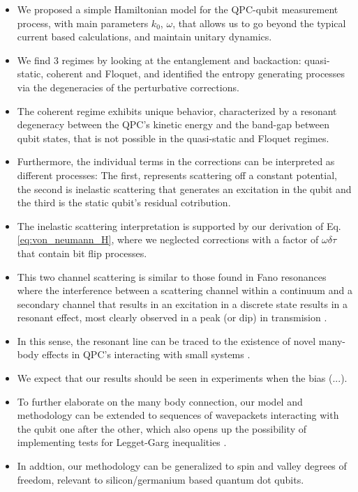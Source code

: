 \documentclass[10pt,
 amsmath,amssymb,
 aps,prb, twocolumn
]{revtex4-2}
\begin{document}
\begin{itemize}
    \item We proposed a simple Hamiltonian model for the
    QPC-qubit measurement process, with main parameters $k_0$, $\omega$, that allows us to go beyond the typical current based calculations, and maintain unitary dynamics.

    \item  We find 3 regimes by looking at the entanglement and backaction: quasi-static, coherent and
    Floquet, and identified the entropy generating processes via the degeneracies of the perturbative corrections.

    \item The coherent regime exhibits unique behavior, characterized by a resonant degeneracy between the QPC's kinetic energy and the band-gap between qubit states, that is not possible in the quasi-static and Floquet regimes.

    \item Furthermore, the individual terms in the corrections can be interpreted as different processes: The first, represents scattering off a constant potential, the second is inelastic scattering that generates an excitation in the qubit \cite{elistratovTheoryWave2023} and the third is the static qubit's residual cotribution.

    \item The inelastic scattering interpretation is supported by our derivation of Eq.\eqref{eq:von_neumann_H}, where we neglected corrections with a factor of $\omega \delta \tau$ that contain bit flip processes.

    \item This two channel scattering is similar to those found in Fano resonances where the interference between a scattering channel within a continuum and a secondary channel that results in an excitation in a discrete state results in a resonant effect, most clearly observed in a peak (or dip) in transmision \cite{kobayashiFano2004}.

    \item In this sense, the resonant line can be traced to the existence of novel many-body effects in QPC's interacting with small systems \cite{ouyangBackaction2010, youngInelasticBackaction2010, snymanPolarization2007}.

    \item We expect that our results should be seen in experiments when the bias (...).

    \item To further elaborate on the many body connection, our model and methodology can be extended to sequences of wavepackets interacting with the qubit one after the other, which also opens up the possibility of implementing tests for Legget-Garg inequalities \cite{jordan2008}.

    \item In addtion, our methodology can be generalized to spin and valley degrees of freedom, relevant to silicon/germanium based quantum dot qubits.
\end{itemize}
\end{document}
